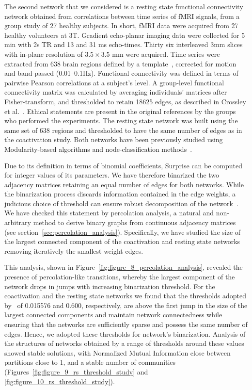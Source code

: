 The second network that we considered is a resting state functional connectivity network obtained from correlations between time series of fMRI signals, from a group study of 27 healthy subjects. In short, fMRI data were acquired from 27 healthy volunteers at 3T. Gradient echo-planar imaging data were collected for 5 min with 2s TR and 13 and 31 ms echo-times. Thirty six interleaved 3mm slices with in-plane resolution of $3.5\times 3.5$ mm were acquired. 
Time series were extracted from 638 brain regions defined by a template~\cite{crossley2013a}, corrected for motion and band-passed (0.01–0.1Hz).
Functional connectivity was defined in terms of pairwise Pearson correlations at a subject's level.
A group-level functional connectivity matrix was calculated by averaging individuals' matrices after Fisher-transform, and thresholded to retain 18625 edges, as described in Crossley et al.~\cite{crossley2013a}.
Ethical statements are present in the original references by the groups who performed the experiments. 
The resting state network was built using the same set of 638 regions and thresholded to have the same number of edges as in the coactivation study.
Both networks have been previously studied using Modularity-based algorithms and node-classification methods~\cite{crossley2013a}.

Due to its definition in terms of binomial coefficients, Surprise can be computed for integer values of its parameters.
We have therefore binarized the two adjacency matrices retaining an equal number of edges for both networks. While the binarization process discards information contained in the edge weights, a judicious choice of threshold can ensure robust decomposition of the network~\cite{meunier2010,he2009}.
We have checked this statement by percolation analysis, a natural and non-arbitrary method to derive binary graphs from continuous adjacency matrices (see section~\ref{sec:percolation_analysis}).
Specifically, we have studied the size of the largest connected component of the coactivation and resting state networks removing iteratively the smallest weight edges.

This analysis, shown in Figure~\ref{fig:figure_8_percolation_analysis}, revealed the presence of percolation-like transitions, whereby the largest component of the network drops in jumps with increasing binarization threshold. For the coactivation and the resting state networks we found that the thresholds adopted by~\cite{crossley2013a} of 0.015576 and 0.600, respectively, are above the first jump in the size of the largest connected components and maintain network connectedness while ensuring that the networks are sufficiently sparse and possess the same number of edges.  Hence, we adopted these thresholds for network's binarization. Analysis of the structures of networks obtained by a range of thresholds around these values showed stable solutions, with Normalized Mutual Information close between partitions close to 1, and a stable number of communities (Figures~\ref{fig:figure_9_rs_threshold_study} and \ref{fig:figure_10_rs_threshold_study}).

